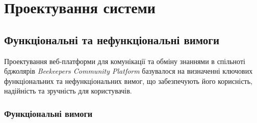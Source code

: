 \chapter{Проектування системи}
\label{ch:design}

\section{Функціональні та нефункціональні вимоги}
\label{sec:requirements}
Проектування веб-платформи для комунікації та обміну знаннями в спільноті бджолярів \textit{Beekeepers Community Platform} базувалося на визначенні ключових функціональних та нефункціональних вимог, що забезпечують його корисність, надійність та зручність для користувачів.

\subsection{Функціональні вимоги}
